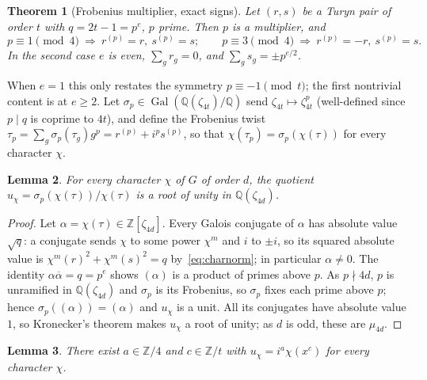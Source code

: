 \documentclass[11pt]{article}
\theoremstyle{plain}
\newtheorem{theorem}{Theorem}[section]
\newtheorem{lemma}[theorem]{Lemma}
\theoremstyle{definition}
\theoremstyle{remark}
\newcommand{\Z}{\mathbb Z}
\newcommand{\Q}{\mathbb Q}
\newcommand{\Gal}{\operatorname{Gal}}
\begin{document}
\begin{theorem}[Frobenius multiplier, exact signs]\label{thm:multiplier}
Let $(r,s)$ be a Turyn pair of order $t$ with $q=2t-1=p^e$, $p$ prime. Then $p$
is a multiplier, and
\[
  p\equiv1\!\!\pmod4\ \Rightarrow\ r^{(p)}=r,\ s^{(p)}=s;
  \qquad
  p\equiv3\!\!\pmod4\ \Rightarrow\ r^{(p)}=-r,\ s^{(p)}=s.
\]
In the second case $e$ is even, $\sum_g r_g=0$, and $\sum_g s_g=\pm p^{e/2}$.
\end{theorem}

When $e=1$ this only restates the symmetry $p\equiv-1\pmod t$; the first
nontrivial content is at $e\ge2$. Let $\sigma_p\in\Gal(\Q(\zeta_{4t})/\Q)$ send
$\zeta_{4t}\mapsto\zeta_{4t}^p$ (well-defined since $p\mid q$ is coprime to
$4t$), and define the Frobenius twist
$\tau_p=\sum_g\sigma_p(\tau_g)g^p=r^{(p)}+i^p s^{(p)}$, so that
$\chi(\tau_p)=\sigma_p(\chi(\tau))$ for every character $\chi$.

\begin{lemma}\label{lem:per-character-unit}
For every character $\chi$ of $G$ of order $d$, the quotient
$u_\chi=\sigma_p(\chi(\tau))/\chi(\tau)$ is a root of unity in $\Q(\zeta_{4d})$.
\end{lemma}

\begin{proof}
Let $\alpha=\chi(\tau)\in\Z[\zeta_{4d}]$. Every Galois conjugate of $\alpha$ has
absolute value $\sqrt q$: a conjugate sends $\chi$ to some power $\chi^m$ and
$i$ to $\pm i$, so its squared absolute value is $\chi^m(r)^2+\chi^m(s)^2=q$
by~\eqref{eq:charnorm}; in particular $\alpha\ne0$. The identity
$\alpha\overline\alpha=q=p^e$ shows $(\alpha)$ is a product of primes above $p$.
As $p\nmid4d$, $p$ is unramified in $\Q(\zeta_{4d})$ and $\sigma_p$ is its
Frobenius, so $\sigma_p$ fixes each prime above $p$; hence
$\sigma_p((\alpha))=(\alpha)$ and $u_\chi$ is a unit. All its conjugates have
absolute value $1$, so Kronecker's theorem makes $u_\chi$ a root of unity; as
$d$ is odd, these are $\mu_{4d}$.
\end{proof}

\begin{lemma}\label{lem:coherence}
There exist $a\in\Z/4$ and $c\in\Z/t$ with $u_\chi=i^a\chi(x^c)$ for every
character $\chi$.
\end{lemma}
\end{document}
